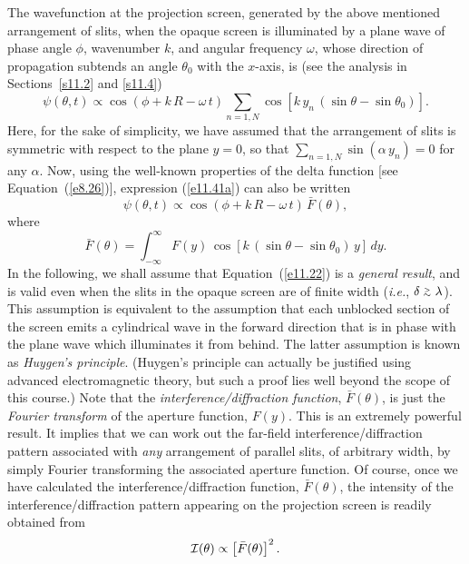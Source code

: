The wavefunction at the projection screen, generated by the above mentioned arrangement of slits, when  the opaque screen is
illuminated by a plane wave of phase angle $\phi$, wavenumber $k$, and angular frequency $\omega$, whose
direction of propagation subtends an angle $\theta_0$ with the $x$-axis, is (see the analysis in Sections~\ref{s11.2} and \ref{s11.4})
\begin{equation}\label{e11.41a}
\psi(\theta,t)\propto \cos(\phi+k\,R-\omega\,t)\sum_{n=1,N} \cos[k\,y_n\,(\sin\theta-\sin\theta_0)].
\end{equation}
Here, for the sake of simplicity, we have assumed that the arrangement of slits is symmetric with respect to the
plane $y=0$, so that $\sum_{n=1,N} \sin(\alpha\,y_n) =0$ for any $\alpha$. 
Now, using the well-known properties of the delta function [see Equation~(\ref{e8.26})], expression (\ref{e11.41a}) can also be written
\begin{equation}\label{e11.22}
\psi(\theta,t) \propto \cos(\phi+ k\,R-\omega\,t)\,\bar{F}(\theta),
\end{equation}
where
\begin{equation}\label{e11.23a}
\bar{F}(\theta) = \int_{-\infty}^\infty F(y)\,\cos[k\,(\sin\theta-\sin\theta_0)\,y]\,dy.
\end{equation}
In the following, we shall assume that Equation~(\ref{e11.22}) is a {\em general result}, and is valid even when the
slits in the opaque screen are of finite width ({\em i.e.}, $\delta\stackrel {_{\normalsize>}}{_{\normalsize \sim}} \lambda$). This assumption is equivalent to the assumption  that each unblocked section of the screen emits a cylindrical wave in the forward direction that is in phase with
the plane wave which illuminates it from behind. The latter assumption is known as {\em Huygen's principle}. 
 (Huygen's principle can actually be justified using advanced electromagnetic
theory, but such a proof lies well beyond the scope of this course.)
Note that the {\em interference/diffraction function}, $\bar{F}(\theta)$, is just the {\em Fourier transform}\/ of the aperture function, $F(y)$. 
This is an extremely powerful result. It implies that we can work out the far-field interference/diffraction pattern associated
with {\em any}\/ arrangement of parallel slits, of arbitrary  width,  by simply Fourier transforming the associated aperture function. Of course, once we have calculated the interference/diffraction function, $\bar{F}(\theta)$, the intensity of the
interference/diffraction pattern appearing on the projection screen is readily obtained from
\begin{equation}
{\cal I}(\theta) \propto \left[\bar{F}(\theta)\right]^2.
\end{equation}

